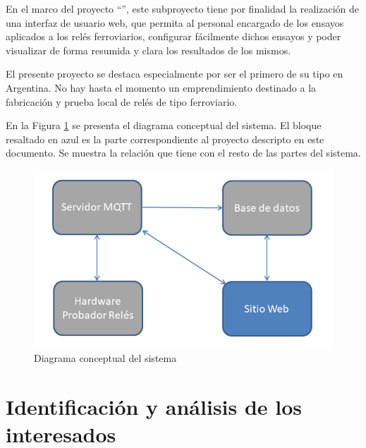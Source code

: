 \documentclass[11pt]{charter}
\begin{document}
En el marco del proyecto ``\ttitle'', este subproyecto tiene por finalidad la realización de una interfaz de usuario web, que permita al personal encargado de los ensayos aplicados a los relés ferroviarios, configurar fácilmente dichos ensayos y poder visualizar de forma resumida y clara los resultados de los mismos.

El presente proyecto se destaca  especialmente por ser el primero de su tipo en Argentina. No hay hasta el momento un emprendimiento destinado a la fabricación y prueba local de relés de tipo ferroviario.

En la Figura \ref{fig:diagBloques} se presenta el diagrama conceptual del sistema. El bloque resaltado en azul es la parte correspondiente al proyecto descripto en este documento. Se muestra la relación que tiene con el resto de las partes del sistema.

\vspace{25px}

\begin{figure}[htpb]
\centering 
\includegraphics[width=.7\textwidth]{./Figuras/diagramaConceptual.png}
\caption{Diagrama conceptual del sistema}
\label{fig:diagBloques}
\end{figure}

\vspace{25px}

\newpage

\section{Identificación y análisis de los interesados}
\label{sec:interesados}
\end{document}

